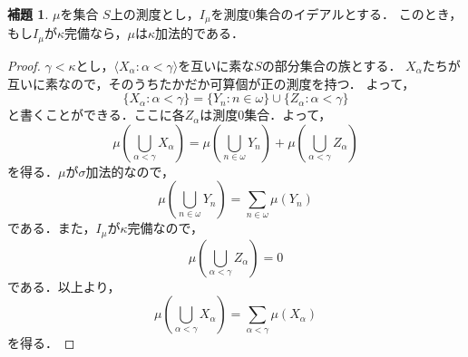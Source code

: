 \documentclass[uplatex]{jsarticle}
\newcommand{\seq}[1]{{\langle#1\rangle}}
\theoremstyle{definition}
\newtheorem{lem}[thm]{補題}
\begin{document}
	\begin{lem}
		$\mu$を集合 $S$上の測度とし，$I_\mu$を測度$0$集合のイデアルとする．
		このとき，もし$I_\mu$が$\kappa$完備なら，$\mu$は$\kappa$加法的である．
	\end{lem}
	\begin{proof}
		$\gamma < \kappa$とし，$\seq{X_\alpha : \alpha < \gamma}$を互いに素な$S$の部分集合の族とする．
		$X_\alpha$たちが互いに素なので，そのうちたかだか可算個が正の測度を持つ．
		よって，
		\[
		\{ X_\alpha : \alpha < \gamma \} = \{ Y_n : n \in \omega \} \cup \{ Z_\alpha : \alpha < \gamma \}
		\]
		と書くことができる．ここに各$Z_\alpha$は測度$0$集合．よって，
		\[
		\mu(\bigcup_{\alpha < \gamma} X_\alpha) = \mu(\bigcup_{n \in \omega} Y_n) + \mu(\bigcup_{\alpha < \gamma} Z_\alpha)
		\]
		を得る．$\mu$が$\sigma$加法的なので，
		\[
		\mu(\bigcup_{n \in \omega} Y_n) =  \sum_{n \in \omega} \mu(Y_n) 
		\]
		である．また，$I_\mu$が$\kappa$完備なので，
		\[
		\mu(\bigcup_{\alpha < \gamma} Z_\alpha) = 0
		\]
		である．以上より，
		\[
		\mu(\bigcup_{\alpha < \gamma} X_\alpha) = \sum_{\alpha < \gamma} \mu(X_\alpha)
		\]
		を得る．
	\end{proof}
	
\end{document}

